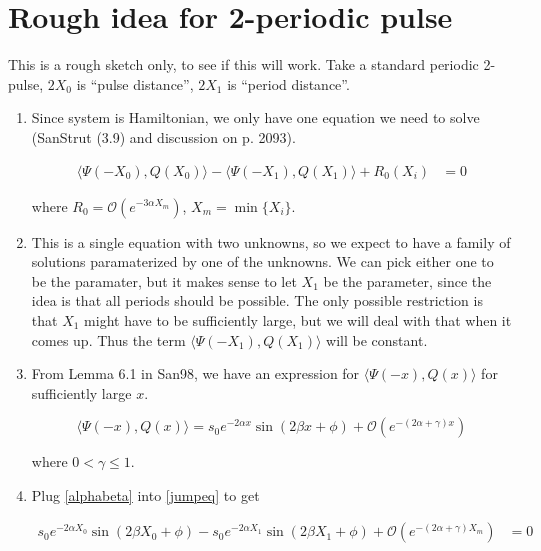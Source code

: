 \documentclass[12pt]{article}
\begin{document}
\section{Rough idea for 2-periodic pulse}

This is a rough sketch only, to see if this will work. Take a standard periodic 2-pulse, $2X_0$ is ``pulse distance'', $2X_1$ is ``period distance''.

\begin{enumerate}

\item Since system is Hamiltonian, we only have one equation we need to solve (SanStrut (3.9) and discussion on p. 2093).

\begin{align}\label{jumpeq}
\langle \Psi(-X_0), Q(X_0) \rangle - \langle \Psi(-X_1), Q(X_1) \rangle + R_0(X_i) &= 0
\end{align}

where $R_0 = \mathcal{O}(e^{-3 \alpha X_m})$, $X_m = \min\{X_i\}$.

\item This is a single equation with two unknowns, so we expect to have a family of solutions paramaterized by one of the unknowns. We can pick either one to be the paramater, but it makes sense to let $X_1$ be the parameter, since the idea is that all periods should be possible. The only possible restriction is that $X_1$ might have to be sufficiently large, but we will deal with that when it comes up. Thus the term $\langle \Psi(-X_1), Q(X_1) \rangle$ will be constant.

\item From Lemma 6.1 in San98, we have an expression for $\langle \Psi(-x), Q(x) \rangle$ for sufficiently large $x$.

\begin{equation}\label{alphabeta}
\langle \Psi(-x), Q(x) \rangle
= s_0 e^{-2 \alpha x} \sin(2 \beta x + \phi) + \mathcal{O}(e^{-(2 \alpha + \gamma) x})
\end{equation}

where $0 < \gamma \leq 1$.

\item Plug \eqref{alphabeta} into \eqref{jumpeq} to get

\begin{align}\label{jumpeq1}
s_0 e^{-2 \alpha X_0} \sin(2 \beta X_0 + \phi) - s_0 e^{-2 \alpha X_1} \sin(2 \beta X_1 + \phi) + \mathcal{O}(e^{-(2 \alpha + \gamma) X_m}) &= 0
\end{align}


\end{enumerate}
\end{document}
